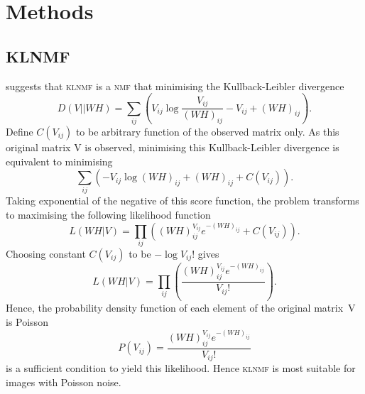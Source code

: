 \section{Methods \label{chapter2}}
\subsection{KLNMF}
\citet{lee2001algorithms} suggests that \textsc{klnmf} is a \textsc{nmf} that minimising the Kullback-Leibler divergence
\begin{equation*}
  D(V||WH)=\sum_{ij}\left(V_{ij}\log\frac{V_{ij}}{\left(WH\right)_{ij}}-V_{ij}+\left(WH\right)_{ij}\right).
\end{equation*}
Define $C(V_{ij})$ to be arbitrary function of the observed matrix only. As this original matrix V is observed, minimising this Kullback-Leibler divergence is equivalent to minimising
\begin{equation*}
  \sum_{ij}\left(-V_{ij}\log\left(WH\right)_{ij}+\left(WH\right)_{ij}+C(V_{ij})\right).
\end{equation*}
Taking exponential of the negative of this score function, the problem transforms to maximising the following likelihood function
\begin{equation*}
L(WH|V)=\prod_{ij}\left(\left(WH\right)_{ij}^{V_{ij}}e^{-\left(WH\right)_{ij}}+C(V_{ij})\right).
\end{equation*}
Choosing constant $C(V_{ij})$ to be $-\log V_{ij}!$ gives
\begin{equation*}
L(WH|V)=\prod_{ij}\left(\frac{\left(WH\right)_{ij}^{V_{ij}}e^{-\left(WH\right)_{ij}}}{V_{ij}!}\right).
\end{equation*}
Hence, the probability density function of each element of the original matrix~V is Poisson
\begin{equation*}
P(V_{ij})=\frac{\left(WH\right)_{ij}^{V_{ij}}e^{-\left(WH\right)_{ij}}}{V_{ij}!}
\end{equation*}
is a sufficient condition to yield this likelihood. Hence \textsc{klnmf} is most suitable for images with Poisson noise.
